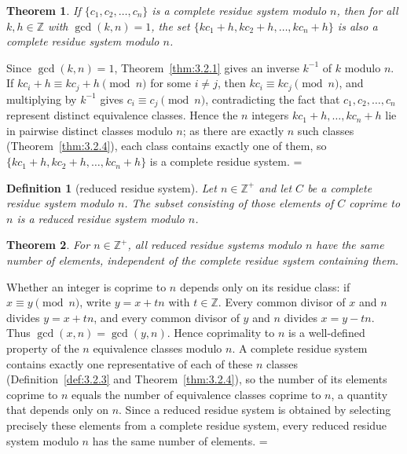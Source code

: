 \documentclass[11pt]{article}
\makeatletter
\let\nt@closedisplay\]
\def\nt@guardedclose{\@ifnextchar\par{\nt@closeafterpar}{\@ifnextchar\end{\postdisplaypenalty\@M\nt@closedisplay}{\nt@closedisplay}}}
\def\nt@closeafterpar\par{\@ifnextchar\par{\nt@closeafterpar}{\@ifnextchar\end{\postdisplaypenalty\@M\nt@closedisplay\par}{\nt@closedisplay\par}}}
\renewenvironment{proof}[1][\proofname]{\par
  \pushQED{\qed}\normalfont\topsep\medskipamount\edef\nt@afterproof{\@endparpenalty=\the\@endparpenalty\relax}\@beginparpenalty\@M\@endparpenalty\@M\let\]\nt@guardedclose\trivlist\item[]\textit{#1\@addpunct{.}} \ignorespaces}{\ifvmode\addpenalty\@M\fi\popQED\nt@afterproof\endtrivlist\@endpefalse}
\theoremstyle{ntstyle}
\newtheorem{theorem}{Theorem}[subsection]
\newtheorem{definition}{Definition}[subsection]
\makeatother
\begin{document}
\begin{theorem}\label{thm:3.2.5} If $\{c_1, c_2, \ldots, c_n\}$ is a
  complete residue system modulo $n$, then for all $k, h \in \mathbb{Z}$ with $\gcd(k, n) = 1$, the set
  $\{k c_1 + h, k c_2 + h, \ldots, k c_n + h\}$ is also a complete residue system modulo $n$.

\end{theorem}

\begin{proof} Since $\gcd(k, n) = 1$, Theorem~\ref{thm:3.2.1} gives
  an inverse $k^{-1}$ of $k$ modulo $n$. If $k c_i + h \equiv k c_j + h \pmod{n}$ for some $i \neq j$, then
  $k c_i \equiv k c_j \pmod{n}$, and
  multiplying by $k^{-1}$ gives $c_i \equiv c_j \pmod{n}$, contradicting
  the fact that $c_1, c_2, \ldots, c_n$ represent distinct equivalence classes.
  Hence the $n$ integers $k c_1 + h, \ldots, k c_n + h$ lie in pairwise
  distinct classes modulo $n$; as there are exactly $n$ such classes
  (Theorem~\ref{thm:3.2.4}), each class contains exactly one of them, so
  $\{kc_1 + h, kc_2 + h, \ldots, kc_n + h\}$ is a complete residue
  system.
\end{proof}

\begin{definition}[reduced residue system]\label{def:3.2.4}\label{def:reduced-residue-system}
  Let $n\in\mathbb{Z}^+$ and let $C$
  be a complete residue system modulo $n$. The subset consisting of those elements of $C$
  coprime to $n$ is a
  reduced residue system modulo $n$.

\end{definition}

\begin{theorem}\label{thm:3.2.6} For $n\in\mathbb{Z}^+$, all reduced residue systems modulo $n$ have the same number
  of elements, independent of the complete residue system containing
  them.

\end{theorem}

\begin{proof} Whether an integer is coprime to $n$ depends only on its
  residue class: if $x\equiv y\pmod{n}$, write $y=x+tn$ with $t\in\mathbb{Z}$.
  Every common divisor of $x$ and $n$ divides $y=x+tn$, and every common
  divisor of $y$ and $n$ divides $x=y-tn$. Thus $\gcd(x,n)=\gcd(y,n)$. Hence coprimality to $n$
  is a well-defined property of the $n$ equivalence classes modulo $n$.
  A complete residue system contains exactly one representative of each
  of these $n$ classes (Definition~\ref{def:3.2.3} and Theorem~\ref{thm:3.2.4}), so the number of its elements coprime to $n$
  equals the number of equivalence classes coprime to $n$, a
  quantity that depends only on $n$. Since a reduced residue system is
  obtained by selecting precisely these elements from a complete residue system, every reduced residue system modulo
  $n$ has the same number of elements.
\end{proof}
\end{document}
